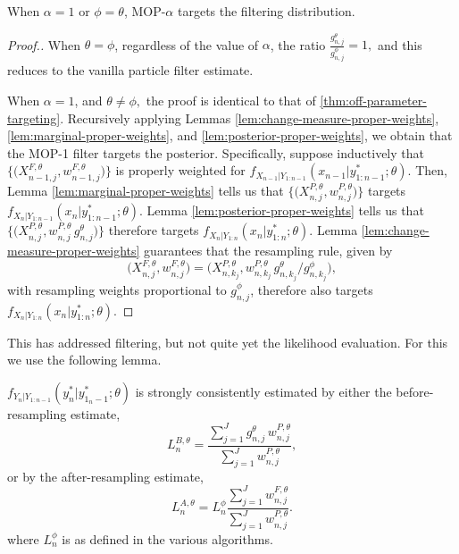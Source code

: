 \documentclass[11pt]{article}
\theoremstyle{thmstylethree}%
\begin{document}
\begin{prop}
    When $\alpha=1$ or $\phi=\theta$, MOP-$\alpha$ targets the filtering distribution. 
\end{prop}
\begin{proof}[Proof.]
    When $\theta=\phi$, regardless of the value of $\alpha$, the ratio $\frac{g_{n,j}^\theta}{g_{n,j}^\phi}=1,$ and this reduces to the vanilla particle filter estimate.

    When $\alpha=1$, and $\theta\neq\phi,$ the proof is identical to that of \ref{thm:off-parameter-targeting}. Recursively applying Lemmas \ref{lem:change-measure-proper-weights}, \ref{lem:marginal-proper-weights}, and \ref{lem:posterior-proper-weights}, we obtain that 
    the MOP-1 filter targets the posterior.
    Specifically, suppose inductively that $\big\{\big(X^{F,\theta}_{n-1,j},w^{F,\theta}_{n-1,j}\big)\big\}$ is properly weighted for $f_{X_{n-1}|Y_{1:n-1}}(x_{n-1}|y^*_{1:n-1};\theta)$.
    Then, Lemma \ref{lem:marginal-proper-weights} tells us that $\big\{\big(X^{P,\theta}_{n,j},w^{P,\theta}_{n,j}\big)\big\}$ targets $f_{X_{n}|Y_{1:n-1}}(x_{n}|y^*_{1:n-1};\theta)$.
    Lemma \ref{lem:posterior-proper-weights} tells us that $\big\{\big(X^{P,\theta}_{n,j},w^{P,\theta}_{n,j} \, g^\theta_{n,j} \big)\big\}$ therefore targets  $f_{X_{n}|Y_{1:n}}(x_{n}|y^*_{1:n};\theta)$.
    Lemma \ref{lem:change-measure-proper-weights} guarantees that the resampling rule, given by 
    \begin{equation}
    \big(X^{F,\theta}_{n,j},w^{F,\theta}_{n,j}\big) = \big(X^{P,\theta}_{n,k_j}, w^{P,\theta}_{n,k_j} \, g^\theta_{n,k_j}\big/ g^\phi_{n,k_j}\big),
    \end{equation}
    with resampling weights proportional to $g^\phi_{n,j}$, therefore also targets $f_{X_{n}|Y_{1:n}}(x_{n}|y^*_{1:n};\theta)$.
\end{proof}

This has addressed filtering, but not quite yet the likelihood evaluation. For this we use the following lemma.

\begin{lem}
    \label{lem:lik-proper-weight}
  $f_{Y_n|Y_{1:n-1}}(y_n^*|y_{1_n-1}^*;\theta)$ is strongly consistently estimated by either the before-resampling estimate,
\begin{equation}\label{L1}
L_n^{B,\theta} =  \frac{\sum_{j=1}^Jg^\theta_{n,j} \, w^{P,\theta}_{n,j}}{\sum_{j=1}^J  w^{P,\theta}_{n,j}},
\end{equation}
or by the after-resampling estimate,
\begin{equation}\label{L2}
L_n^{A,\theta} = L^\phi_n \frac{\sum_{j=1}^Jw^{F,\theta}_{n,j}}{\sum_{j=1}^J  w^{P,\theta}_{n,j}}.
\end{equation}
where $L^\phi_n$ is as defined in the various algorithms.
\end{lem}
\end{document}
